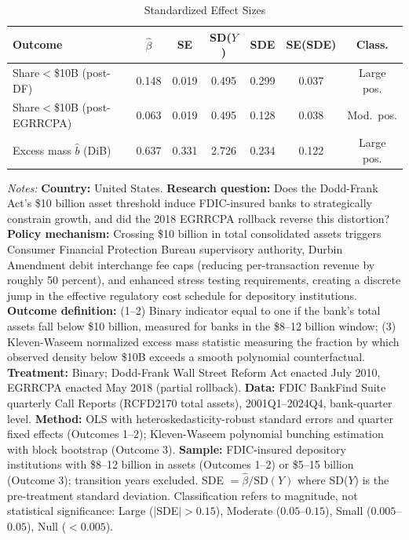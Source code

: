 \begin{table}[htbp]
\centering
\begin{threeparttable}
\caption{Standardized Effect Sizes}
\label{tab:sde}
\small
\begin{tabular}{lcccccc}
\toprule
Outcome & $\hat{\beta}$ & SE & SD($Y$) & SDE & SE(SDE) & Class. \\
\midrule
Share$<$\$10B (post-DF) & 0.148 & 0.019 & 0.495 & 0.299 & 0.037 & Large pos. \\
Share$<$\$10B (post-EGRRCPA) & 0.063 & 0.019 & 0.495 & 0.128 & 0.038 & Mod.\ pos. \\
Excess mass $\hat{b}$ (DiB) & 0.637 & 0.331 & 2.726 & 0.234 & 0.122 & Large pos. \\
\bottomrule
\end{tabular}
\begin{tablenotes}[flushleft]
\small
\item \textit{Notes:} \textbf{Country:} United States. \textbf{Research question:} Does the Dodd-Frank Act's \$10 billion asset threshold induce FDIC-insured banks to strategically constrain growth, and did the 2018 EGRRCPA rollback reverse this distortion? \textbf{Policy mechanism:} Crossing \$10 billion in total consolidated assets triggers Consumer Financial Protection Bureau supervisory authority, Durbin Amendment debit interchange fee caps (reducing per-transaction revenue by roughly 50 percent), and enhanced stress testing requirements, creating a discrete jump in the effective regulatory cost schedule for depository institutions. \textbf{Outcome definition:} (1--2) Binary indicator equal to one if the bank's total assets fall below \$10 billion, measured for banks in the \$8--12 billion window; (3) Kleven-Waseem normalized excess mass statistic measuring the fraction by which observed density below \$10B exceeds a smooth polynomial counterfactual. \textbf{Treatment:} Binary; Dodd-Frank Wall Street Reform Act enacted July 2010, EGRRCPA enacted May 2018 (partial rollback). \textbf{Data:} FDIC BankFind Suite quarterly Call Reports (RCFD2170 total assets), 2001Q1--2024Q4, bank-quarter level. \textbf{Method:} OLS with heteroskedasticity-robust standard errors and quarter fixed effects (Outcomes 1--2); Kleven-Waseem polynomial bunching estimation with block bootstrap (Outcome 3). \textbf{Sample:} FDIC-insured depository institutions with \$8--12 billion in assets (Outcomes 1--2) or \$5--15 billion (Outcome 3); transition years excluded. SDE $= \hat{\beta} / \text{SD}(Y)$ where SD($Y$) is the pre-treatment standard deviation. Classification refers to magnitude, not statistical significance: Large ($|$SDE$| > 0.15$), Moderate ($0.05$--$0.15$), Small ($0.005$--$0.05$), Null ($< 0.005$).
\end{tablenotes}
\end{threeparttable}
\end{table}
